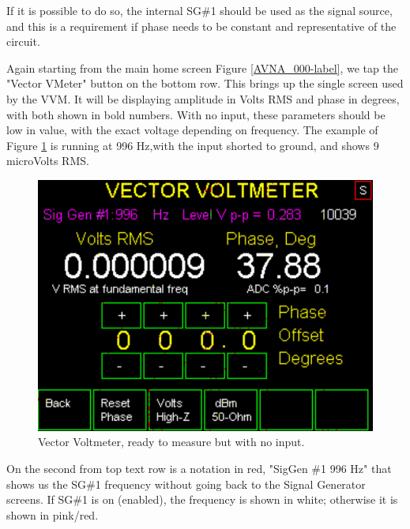 If it is possible to do so, the internal SG\#1 should be used as the signal source, and this is a requirement if phase needs to be constant and representative of the circuit.

Again starting from the main home screen Figure \ref{AVNA_000-label}, we tap the "\textsf{Vector VMeter}" button on the bottom row.  This brings up the single screen used by the VVM.  It will be displaying amplitude in \textsf{Volts RMS}  and phase in degrees, with both shown in bold numbers.  With no input, these parameters should be low in value, with the exact voltage depending on frequency.  The example of Figure  \ref{AVNA_015-label} is running at 996 Hz,with the input shorted to ground, and shows 9 microVolts RMS.
%
\begin{figure}[H]
\begin{center}
\includegraphics[scale=0.75]{./images/AVNA_015.pdf}
\caption{Vector Voltmeter, ready to measure but with no input.}
\label{AVNA_015-label}
\end{center}
\end{figure}
%
On the second from top text row is a notation in red, "\textsf{SigGen \#1 996 Hz}" that shows us the SG\#1 frequency without going back to the Signal Generator screens.  If SG\#1 is on (enabled), the frequency is shown in white; otherwise it is shown in pink/red.

